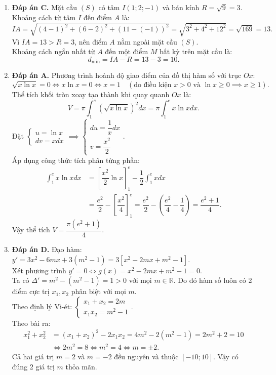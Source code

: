 \documentclass[12pt,a4paper]{article}
\begin{document}
\begin{enumerate}[label=\textbf{Câu \arabic*:}, leftmargin=*]
\item \textbf{Đáp án C.}
Mặt cầu $(S)$ có tâm $I(1; 2; -1)$ và bán kính $R = \sqrt{9} = 3$.\\
Khoảng cách từ tâm $I$ đến điểm $A$ là:
$$IA = \sqrt{(4 - 1)^2 + (6 - 2)^2 + (11 - (-1))^2} = \sqrt{3^2 + 4^2 + 12^2} = \sqrt{169} = 13.$$
Vì $IA = 13 > R = 3$, nên điểm $A$ nằm ngoài mặt cầu $(S)$.\\
Khoảng cách ngắn nhất từ $A$ đến một điểm $M$ bất kỳ trên mặt cầu là:
$$d_{\min} = IA - R = 13 - 3 = 10.$$

\item \textbf{Đáp án A.}
Phương trình hoành độ giao điểm của đồ thị hàm số với trục $Ox$:
$$\sqrt{x \ln x} = 0 \iff x \ln x = 0 \iff x = 1\quad (\text{do điều kiện } x > 0 \text{ và } \ln x \ge 0 \implies x \ge 1).$$
Thể tích khối tròn xoay tạo thành khi quay quanh $Ox$ là:
$$V = \pi \int_1^e \left(\sqrt{x \ln x}\right)^2 dx = \pi \int_1^e x \ln x dx.$$
Đặt $\begin{cases} u = \ln x \\ dv = x dx \end{cases} \implies \begin{cases} du = \dfrac{1}{x} dx \\ v = \dfrac{x^2}{2} \end{cases}$.\\
Áp dụng công thức tích phân từng phần:
\begin{align*}
\int_1^e x \ln x dx &= \left[ \dfrac{x^2}{2} \ln x \right]_1^e - \dfrac{1}{2} \int_1^e x dx \\
&= \dfrac{e^2}{2} - \left[ \dfrac{x^2}{4} \right]_1^e = \dfrac{e^2}{2} - \left(\dfrac{e^2}{4} - \dfrac{1}{4}\right) = \dfrac{e^2 + 1}{4}.
\end{align*}
Vậy thể tích $V = \dfrac{\pi(e^2 + 1)}{4}$.

\item \textbf{Đáp án D.}
Đạo hàm: $y' = 3x^2 - 6mx + 3(m^2 - 1) = 3\left[ x^2 - 2mx + m^2 - 1 \right]$.\\
Xét phương trình $y' = 0 \iff g(x) = x^2 - 2mx + m^2 - 1 = 0$.\\
Ta có $\Delta' = m^2 - (m^2 - 1) = 1 > 0$ với mọi $m \in \mathbb{R}$. Do đó hàm số luôn có 2 điểm cực trị $x_1, x_2$ phân biệt với mọi $m$.\\
Theo định lý Vi-ét: $\begin{cases} x_1 + x_2 = 2m \\ x_1 x_2 = m^2 - 1 \end{cases}$.\\
Theo bài ra:
\begin{align*}
x_1^2 + x_2^2 &= (x_1 + x_2)^2 - 2x_1 x_2 = 4m^2 - 2(m^2 - 1) = 2m^2 + 2 = 10 \\
&\iff 2m^2 = 8 \iff m^2 = 4 \iff m = \pm 2.
\end{align*}
Cả hai giá trị $m = 2$ và $m = -2$ đều nguyên và thuộc $[-10; 10]$. Vậy có đúng 2 giá trị $m$ thỏa mãn.
\end{enumerate}
\end{document}
